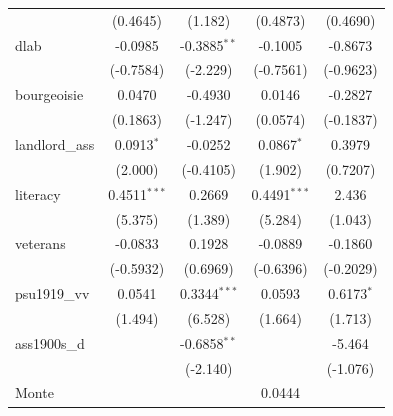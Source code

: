 \begin{table}[htbp]
\begin{tabular}{lcccc}
                                       & (0.4645)               & (1.182)                & (0.4873)               & (0.4690)\\   
      dlab                             & -0.0985                & -0.3885$^{**}$         & -0.1005                & -0.8673\\   
                                       & (-0.7584)              & (-2.229)               & (-0.7561)              & (-0.9623)\\   
      bourgeoisie                      & 0.0470                 & -0.4930                & 0.0146                 & -0.2827\\   
                                       & (0.1863)               & (-1.247)               & (0.0574)               & (-0.1837)\\   
      landlord\_ass                    & 0.0913$^{*}$           & -0.0252                & 0.0867$^{*}$           & 0.3979\\   
                                       & (2.000)                & (-0.4105)              & (1.902)                & (0.7207)\\   
      literacy                         & 0.4511$^{***}$         & 0.2669                 & 0.4491$^{***}$         & 2.436\\   
                                       & (5.375)                & (1.389)                & (5.284)                & (1.043)\\   
      veterans                         & -0.0833                & 0.1928                 & -0.0889                & -0.1860\\   
                                       & (-0.5932)              & (0.6969)               & (-0.6396)              & (-0.2029)\\   
      psu1919\_vv                      & 0.0541                 & 0.3344$^{***}$         & 0.0593                 & 0.6173$^{*}$\\   
                                       & (1.494)                & (6.528)                & (1.664)                & (1.713)\\   
      ass1900s\_d                      &                        & -0.6858$^{**}$         &                        & -5.464\\   
                                       &                        & (-2.140)               &                        & (-1.076)\\   
      Monte                            &                        &                        & 0.0444                 &   \\   

\end{tabular}
\end{table}
